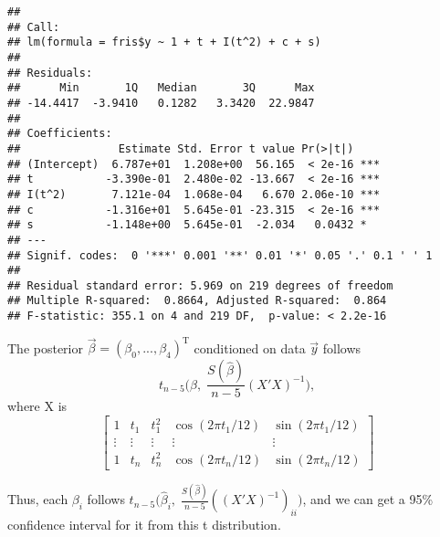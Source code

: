 \documentclass[
]{article}
\newenvironment{Shaded}{\begin{snugshade}}{\end{snugshade}}
\newcommand{\CommentTok}[1]{\textcolor[rgb]{0.56,0.35,0.01}{\textit{#1}}}
\newcommand{\DecValTok}[1]{\textcolor[rgb]{0.00,0.00,0.81}{#1}}
\newcommand{\FunctionTok}[1]{\textcolor[rgb]{0.00,0.00,0.00}{#1}}
\newcommand{\NormalTok}[1]{#1}
\newcommand{\OtherTok}[1]{\textcolor[rgb]{0.56,0.35,0.01}{#1}}
\newcommand{\SpecialCharTok}[1]{\textcolor[rgb]{0.00,0.00,0.00}{#1}}
\begin{document}
\begin{verbatim}
## 
## Call:
## lm(formula = fris$y ~ 1 + t + I(t^2) + c + s)
## 
## Residuals:
##      Min       1Q   Median       3Q      Max 
## -14.4417  -3.9410   0.1282   3.3420  22.9847 
## 
## Coefficients:
##               Estimate Std. Error t value Pr(>|t|)    
## (Intercept)  6.787e+01  1.208e+00  56.165  < 2e-16 ***
## t           -3.390e-01  2.480e-02 -13.667  < 2e-16 ***
## I(t^2)       7.121e-04  1.068e-04   6.670 2.06e-10 ***
## c           -1.316e+01  5.645e-01 -23.315  < 2e-16 ***
## s           -1.148e+00  5.645e-01  -2.034   0.0432 *  
## ---
## Signif. codes:  0 '***' 0.001 '**' 0.01 '*' 0.05 '.' 0.1 ' ' 1
## 
## Residual standard error: 5.969 on 219 degrees of freedom
## Multiple R-squared:  0.8664, Adjusted R-squared:  0.864 
## F-statistic: 355.1 on 4 and 219 DF,  p-value: < 2.2e-16
\end{verbatim}

The posterior \(\vec\beta = (\beta_0, ..., \beta_4)^\text{T}\)
conditioned on data \(\vec y\) follows
\[t_{n-5}\big(\hat\beta, \; \frac{S(\hat\beta)}{n-5}(X'X)^{-1}\big),\]
where X is \[\begin{bmatrix}
1 & t_1 & t_1^2 & \cos(2\pi t_1/12) & \sin(2\pi t_1/12) \\
\vdots & \vdots & \vdots & \vdots & \vdots \\
1 & t_n & t_n^2 & \cos(2\pi t_n/12) & \sin(2\pi t_n/12)
\end{bmatrix}\]

Thus, each \(\beta_i\) follows
\(t_{n-5}\big(\hat\beta_i, \; \frac{S(\hat\beta)}{n-5}((X'X)^{-1})_{ii}\big)\),
and we can get a 95\% confidence interval for it from this t
distribution.

\begin{Shaded}
\end{Shaded}
\end{document}
